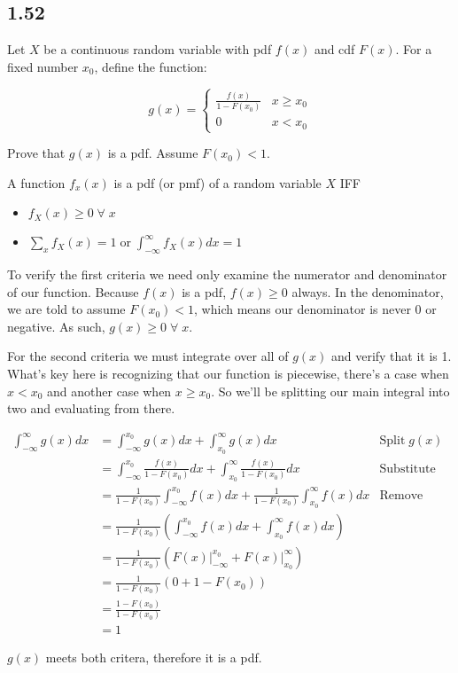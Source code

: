 \subsection*{1.52}

Let $X$ be a continuous random variable with pdf $f(x)$ and cdf $F(x)$. For a fixed number $x_0$, define the function:

\[
	g(x) = \begin{cases}
		\frac{f(x)}{1 - F(x_0)} & x \geq x_0 \\
		0 & x < x_0
	\end{cases}
\]

Prove that $g(x)$ is a pdf. Assume $F(x_0) < 1$.

\begin{theorem}[1.6.5]
	A function $f_x(x)$ is a pdf (or pmf) of a random variable $X$ IFF
	\begin{itemize}
		\item $f_X(x) \geq 0 \; \forall \; x$
		\item $\sum_x f_X(x) = 1 \; \text{or} \; \int_{-\infty}^{\infty} f_X(x)dx = 1$ 
	\end{itemize}
\end{theorem}

To verify the first criteria we need only examine the numerator and denominator of our function. Because $f(x)$ is a pdf, $f(x) \geq 0$ always. In the denominator, we are told to assume $F(x_0) < 1$, which means our denominator is never 0 or negative. As such, $g(x) \geq 0 \; \forall \; x$. 

For the second criteria we must integrate over all of $g(x)$ and verify that it is 1. What's key here is recognizing that our function is piecewise, there's a case when $x < x_0$ and another case when $x \geq x_0$. So we'll be splitting our main integral into two and evaluating from there.

\begin{align*}
	\int_{-\infty}^{\infty} g(x) dx &= \int_{-\infty}^{x_0} g(x) dx + \int_{x_0}^{\infty} g(x) dx & \text{Split} \; g(x) \\
	&= \int_{-\infty}^{x_0} \frac{f(x)}{1 - F(x_0)} dx +  \int_{x_0}^{\infty} \frac{f(x)}{1 - F(x_0)} dx & \text{Substitute} \\
	&= \frac{1}{1 - F(x_0)} \int_{-\infty}^{x_0} f(x) dx + \frac{1}{1 - F(x_0)} \int_{x_0}^{\infty} f(x) dx & \text{Remove constant} \\
	&= \frac{1}{1 - F(x_0)} \left( \int_{-\infty}^{x_0} f(x) dx + \int_{x_0}^{\infty} f(x) dx \right) \\
	&= \frac{1}{1 - F(x_0)} \left( F(x) \rvert_{-\infty}^{x_0} +  F(x) \rvert_{x_0}^{\infty}\right) \\
	&= \frac{1}{1 - F(x_0)} \left( 0 + 1 - F(x_0) \right) \\
	&= \frac{1 - F(x_0)}{1 - F(x_0)} \\
	&= 1
\end{align*}

$g(x)$ meets both critera, therefore it is a pdf. 

